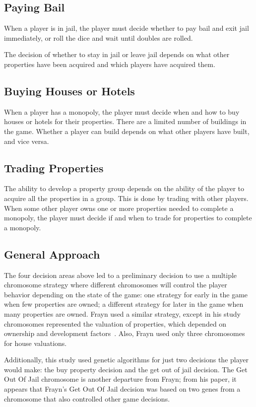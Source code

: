 \subsection{Paying Bail}
When a player is in jail, the player must decide whether to pay bail and exit
jail immediately, or roll the dice and wait until doubles are rolled.

The decision of whether to stay in jail or leave jail depends on what other
properties have been acquired and which players have acquired them.

\subsection{Buying Houses or Hotels}
When a player has a monopoly, the player must decide when and how to buy houses
or hotels for their properties. There are a limited number of buildings in the
game. Whether a player can build depends on what other players have built, and
vice versa.

\subsection{Trading Properties}
The ability to develop a property group depends on the ability of the player to
acquire all the properties in a group. This is done by trading with other
players. When some other player owns one or more properties needed to complete a
monopoly, the player must decide if and when to trade for properties to complete
a monopoly.

\subsection{General Approach}

The four decision areas above led to a preliminary decision to use a multiple
chromosome strategy where different chromosomes will control the player behavior
depending on the state of the game: one strategy for early in the game when few
properties are owned; a different strategy for later in the game when many
properties are owned. Frayn used a similar strategy, except in his study
chromosomes represented the valuation of properties, which depended on ownership
and development factors~\cite{DBLP:conf/cig/Frayn05}. Also, Frayn used only 
three chromosomes for house valuations. 

Additionally, this study used genetic algorithms for just two decisions the
player would make: the buy property decision and the get out of jail decision.
The Get Out Of Jail chromosome is another departure from Frayn; from his paper,
it appears that Frayn's Get Out Of Jail decision was based on two genes from a
chromosome that also controlled other game decisions.
 
